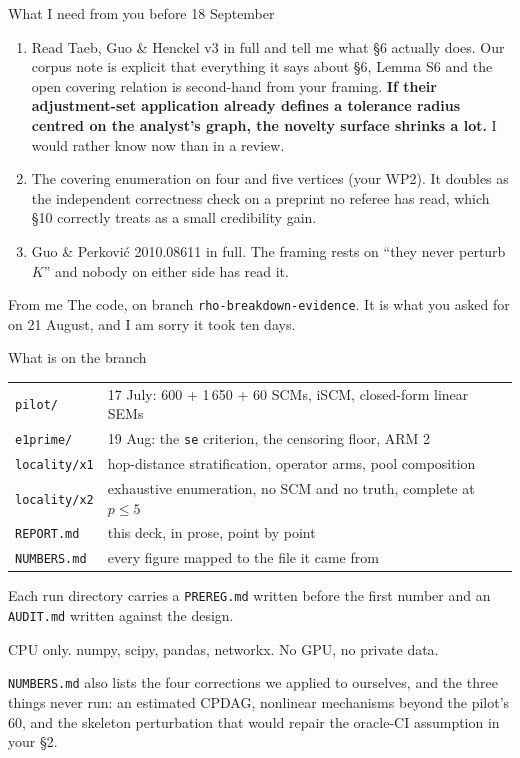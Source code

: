\documentclass[10pt,aspectratio=169]{beamer}
\newcommand{\no}[1]{\textcolor{bad}{#1}}
\newcommand{\wn}[1]{\textcolor{warn}{#1}}
\begin{document}
\begin{frame}{What I need from you before 18 September}
\begin{enumerate}
  \item \no{Read Taeb, Guo \& Henckel v3 in full and tell me what \S6 actually does.} Our corpus note
        is explicit that everything it says about \S6, Lemma S6 and the open covering relation is
        second-hand from your framing. \textbf{If their adjustment-set application already defines a
        tolerance radius centred on the analyst's graph, the novelty surface shrinks a lot.} I would
        rather know now than in a review.
  \item \wn{The covering enumeration on four and five vertices} (your WP2). It doubles as the
        independent correctness check on a preprint no referee has read, which \S10 correctly treats
        as a small credibility gain.
  \item \wn{Guo \& Perković 2010.08611 in full.} The framing rests on ``they never perturb $K$'' and
        nobody on either side has read it.
\end{enumerate}
\vfill
\begin{block}{From me}
The code, on branch \texttt{rho-breakdown-evidence}. It is what you asked for on 21 August, and I am
sorry it took ten days.
\end{block}
\end{frame}

\begin{frame}{What is on the branch}
\begin{center}
\begin{tabular}{ll}
\toprule
\texttt{pilot/} & 17 July: 600 + 1\,650 + 60 SCMs, iSCM, closed-form linear SEMs \\
\texttt{e1prime/} & 19 Aug: the \texttt{se} criterion, the censoring floor, ARM 2 \\
\texttt{locality/x1} & hop-distance stratification, operator arms, pool composition \\
\texttt{locality/x2} & exhaustive enumeration, no SCM and no truth, complete at $p \le 5$ \\
\texttt{REPORT.md} & this deck, in prose, point by point \\
\texttt{NUMBERS.md} & every figure mapped to the file it came from \\
\bottomrule
\end{tabular}
\end{center}

\medskip
Each run directory carries a \texttt{PREREG.md} written before the first number and an
\texttt{AUDIT.md} written against the design.

\smallskip
CPU only. numpy, scipy, pandas, networkx. No GPU, no private data.

\smallskip
\wn{\texttt{NUMBERS.md} also lists the four corrections we applied to ourselves, and the three things
never run: an estimated CPDAG, nonlinear mechanisms beyond the pilot's 60, and the skeleton
perturbation that would repair the oracle-CI assumption in your \S2.}
\end{frame}
\end{document}
